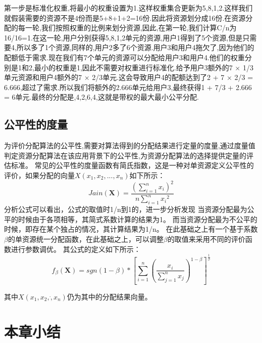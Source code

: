 第一步是标准化权重,将最小的权重设置为1.这样权重集合更新为5,8,1,2.这样我们就假装需要的资源不是4份而是5+8+1+2=16份.因此将资源划分成16份.在资源分配的每一轮,我们按照权重的比例来划分资源,因此,在第一轮,我们计算C/n为16/16=1.在这一轮,用户分别获得5,8,1,2单元的资源,用户1得到了5个资源,但是只需要4,所以多了1个资源,同样的,用户2多了6个资源.用户3和用户4拖欠了,因为他们的配额低于需求.现在我们有7个单元的资源可以分配给用户3和用户4.他们的权重分别是1和2,最小的权重是1,因此不需要对权重进行标准化.给予用户3额外的7 × 1/3单元资源和用户4额外的7 × 2/3单元.这会导致用户4的配额达到了2 + 7 × 2/3 = 6.666,超过了需求.所以我们将额外的2.666单元给用户3,最终获得1 + 7/3 + 2.666 = 6单元.最终的分配是,4,2,6,4,这就是带权的最大最小公平分配.
\subsection{公平性的度量}
为评价分配算法的公平性,需要对算法得到的分配结果进行定量的度量,通过度量值判定资源分配算法在该应用背景下的公平性,为资源分配算法的选择提供定量的评估标准。
常见的公平性的度量函数有简氏指数，这是一种对单资源定义公平性的评价，如果分配的向量$X({x}_{1},{x}_{2},...,{x}_{n})$如下所示：
\begin{equation}
Jain(\textbf{X}) = \frac{{(\sum_{i=1}^{n}{x}_{i})}^{2}}{n\sum_{i=1}^{n}{{x}_{i}}^{2}}
\end{equation}
分析公式可以看出，公式的取值时1/n到1的，进一步分析发现
当资源分配最为公平的时候由于各项相等，其简式系数计算的结果为1。
而当资源分配最为不公平的时候，即存在某个独占的情况，其计算结果为1/n。
在此基础之上有一个基于系数$\beta$的单资源统一分配函数，在此基础之上，可以调整$\beta$的取值来采用不同的评价函数进行参数调优。
其公式的定义如下所示：
\begin{equation}
{f}_{\beta} (\textbf{X})= sgn(1-\beta)*{\left[\sum_{i=1}^{n}{\left(\frac{{x}_{i}}{\sum_{j=1}^{n}{x}_{j}} \right)}^{1 - \beta} \right]}^{\frac{1}{\beta}}
\end{equation}

其中$X({x}_{1},{x}_{2},\dot,{x}_{n})$仍为其中的分配结果向量。


\section{本章小结}
